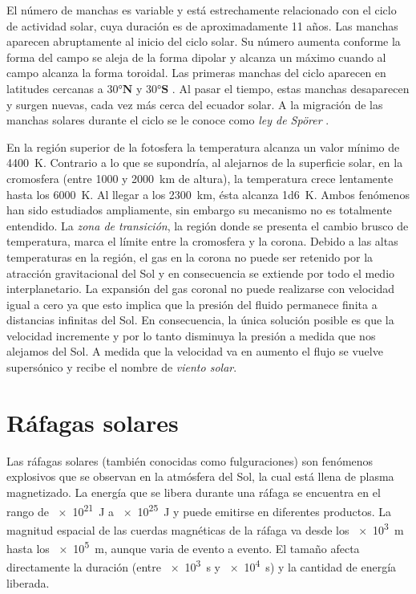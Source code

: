 El número de manchas es variable y está estrechamente relacionado con el ciclo de actividad solar, cuya duración es de aproximadamente \num{11} años. Las manchas aparecen abruptamente al inicio del ciclo solar. Su número aumenta conforme la forma del campo se aleja de la forma dipolar y alcanza un máximo cuando al campo alcanza la forma toroidal. Las primeras manchas del ciclo aparecen en latitudes cercanas a  $\ang{30}\mathbf{N}$ y $\ang{30}\mathbf{S}$ \cite{golub14}. Al pasar el tiempo, estas manchas desaparecen y surgen nuevas, cada vez más cerca del ecuador solar. A la migración de las manchas solares durante el ciclo se le conoce como \emph{ley de Spörer} \cite{noyes82}.

En la región superior de la fotosfera la temperatura alcanza un valor mínimo de \SI{4400}{\kelvin}. Contrario a lo que se supondría, al alejarnos de la superficie solar, en la cromosfera (entre \num{1000} y \SI{2000}{\kilo\metre} de altura), la temperatura crece lentamente hasta los \SI{6000}{\kelvin}. Al llegar a los \SI{2300}{\kilo\metre}, ésta alcanza \SI{1d6}{\kelvin}. Ambos fenómenos han sido estudiados ampliamente, sin embargo su mecanismo no es totalmente entendido. La \emph{zona de transición}, la región donde se presenta el cambio brusco de temperatura, marca el límite entre la cromosfera y la corona. Debido a las altas temperaturas en la región, el gas en la corona no puede ser retenido por la atracción gravitacional del Sol y en consecuencia se extiende por todo el medio interplanetario. La expansión del gas coronal no puede realizarse con velocidad igual a cero ya que esto implica que la presión del fluido permanece finita a distancias infinitas del Sol. En consecuencia, la única solución posible es que la velocidad incremente y por lo tanto disminuya la presión a medida que nos alejamos del Sol. A medida que la velocidad va en aumento el flujo se vuelve supersónico y recibe el nombre de \emph{viento solar}.

\section{Ráfagas solares}

Las ráfagas solares (también conocidas como fulguraciones) son fenómenos explosivos que se observan en la atmósfera del Sol, la cual está llena de plasma magnetizado. La energía que se libera durante una ráfaga se encuentra en el rango de \SI{e21}{\joule} a \SI{e25}{\joule} y puede emitirse en diferentes productos. La magnitud espacial de las cuerdas magnéticas de la ráfaga va desde los \SI{e3}{\metre} hasta los \SI{e5}{\metre}, aunque varia de evento a evento. El tamaño afecta directamente la duración (entre \SI{e3}{\second} y \SI{e4}{\second}) y la cantidad de energía liberada.


